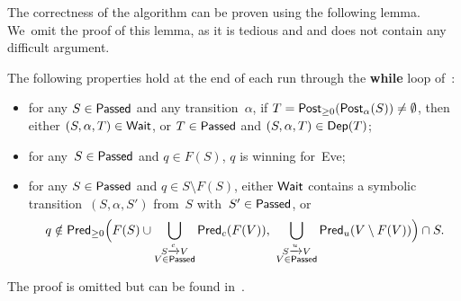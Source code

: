 The correctness of the algorithm can be proven using the following
lemma. We~omit the proof of this lemma, as it is tedious and and does
not contain any difficult argument.

\begin{lemma}\label{9-lem:sotftr}
  The following properties hold at the end of each run through
  the \textbf{while} loop of~:
  \begin{itemize}
  \item for any $S\in\textsf{Passed}$ and any transition~$\alpha$, if
    $T=\textrm{\sf Post}_{\geq 0}(\textrm{\sf Post}_\alpha(S))\not=\emptyset$,
    then either $(S,\alpha,T)\in\textsf{Wait}$, or
    $T\in\textsf{Passed}$ and $(S,\alpha,T)\in\textsf{Dep}(T)$;
  \item for any~$S\in\textsf{Passed}$ and $q\in F(S)$,  $q$ is winning for~Eve;
  \item for any $S\in\textsf{Passed}$ and $q\in S\setminus F(S)$,
    either
    $\textsf{Wait}$ contains a symbolic transition~$(S,\alpha,S')$ from~$S$
    with~$S'\in\textsf{Passed}$,
    or
    \[
      q\notin \predt\Bigl(F(S)\cup \bigcup_{\substack{S\xrightarrow{c} V\\ V\in\Passed}} \predc(F(V)),\ \bigcup_{\substack{S\xrightarrow{u} V\\ V\in\Passed}} \predu(V\setminus F(V))\Bigr) \cap S.
    \]
  \end{itemize}
\end{lemma}
The proof is omitted but can be found in~\cite{CDFLL05}.


